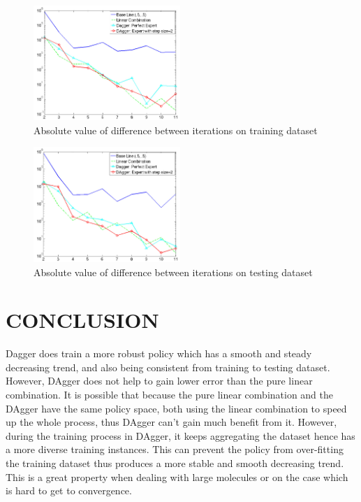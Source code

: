 \documentclass[twoside]{article}
\begin{document}
\begin{figure}[h!]
  \caption{Absolute value of difference between iterations on training dataset}
	\label{fig:converge_training}
    \includegraphics[width=210px]{convergence_Training.jpg}
\end{figure}

\begin{figure}[h!]

  \caption{Absolute value of difference between iterations on testing dataset}
  \label{fig:converge_testing}
    \includegraphics[width=210px]{convergence_Testing.jpg}
\end{figure}


\section{CONCLUSION}

Dagger does train a more robust policy which has a smooth and steady decreasing trend, and also being consistent from training to testing dataset.
 However, DAgger does not help to gain lower error than the pure linear combination.
 It is possible that because the pure linear combination and the DAgger have the same policy space, both using the linear combination to speed up the whole process, thus DAgger can't gain much benefit from it. However, during the training process in DAgger, it keeps aggregating the dataset hence has a more diverse training instances. This can prevent the policy from over-fitting the training dataset thus produces a more stable and smooth decreasing trend. This is a great property when dealing with large molecules or on the case which is hard to get to convergence.
\end{document}
